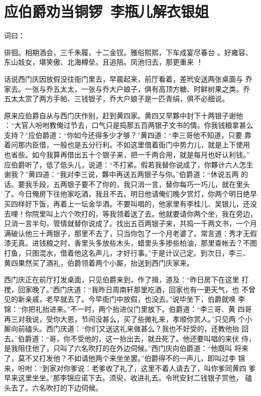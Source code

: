 \chapter{应伯爵劝当铜锣~李瓶儿解衣银姐}

词曰：

徘徊。相期酒会，三千朱履，十二金钗。雅俗熙熙，下车成宴尽春台
。好雍容、东山妓女，堪笑傲、北海樽垒。且追陪。凤池归去，那更重来
！

话说西门庆因放假没往衙门里去，早晨起来，前厅看着，差玳安送两张桌面与
乔家去。一张与乔五太太，一张与乔大户娘子，俱有高顶方糖、时鲜树果之类。乔
五太太赏了两方手帕、三钱银子，乔大户娘子是一匹青绢，俱不必细说。

原来应伯爵自从与西门庆作别，赶到黄四家。黄四又早夥中封下十两银子谢他
：“大官人吩咐教俺过节去，口气只是捣那五百两银子文书的情。你我钱粮拿甚么
支持？”应伯爵道：“你如今还得多少才够？”黄四道：“李三哥他不知道，只要
靠着问那内臣借，一般也是五分行利。不如这里借着衙门中势力儿，就是上下使用
也省些。如今我算再借出五十个银子来，把一千两合用，就是每月也好认利钱。”
应伯爵听了，低了低头儿，说道：“不打紧。假若我替你说成了，你夥计六人怎生
谢我？”黄四道：“我对李三说，夥中再送五两银子与你。”伯爵道：“休说五两
的话。要我手段，五两银子要不了你的，我只消一言，替你每巧一巧儿，就在里头
了。今日俺房下往他家吃酒，我且不去。明日他请俺们晚夕赏灯，你两个明日绝早
买四样好下饭，再着上一坛金华酒。不要叫唱的，他家里有李桂儿、吴银儿，还没
去哩！你院里叫上六个吹打的，等我领着送了去。他就要请你两个坐，我在旁边，
只消一言半句，管情就替你说成了。找出五百两银子来，共捣一千两文书，一个月
满破认他三十两银子，那里不去了，只当你包了一个月老婆了。常言道：秀才无假
漆无真。进钱粮之时，香里头多放些木头，蜡里头多掺些柏油，那里查帐去？不图
打鱼，只图混水，借着他这名声儿，才好行事。”于是计议己定。到次日，李三、
黄四果然买了酒礼，伯爵领着两个小厮，抬送到西门庆家来。

西门庆正在前厅打发桌面，只见伯爵来到，作了揖，道及：“昨日房下在这里
打搅，回家晚了。”西门庆道：“我昨日周南轩那里吃酒，回家也有一更天气，也
不曾见的新亲戚，老早就去了。今早衙门中放假，也没去。”说毕坐下，伯爵就唤
李锦：“你把礼抬进来。”不一时，两个抬进仪门里放下。伯爵道：“李三哥、黄
四哥再三对我说，受你大恩，节间没甚么，买了些微礼来，孝顺你赏人。”只见两
个小厮向前磕头。西门庆道：“你们又送这礼来做甚么？我也不好受的，还教他抬
回去。”伯爵道：“哥，你不受他的，这一抬出去，就丑死了。他还要叫唱的来伏
侍，是我阻住他了，只叫了六名吹打的在外边伺候。”西门庆向伯爵道：“他既叫
将来了，莫不又打发他？不如请他两个来坐坐罢。”伯爵得不的一声儿，即叫过李
锦来，吩咐：“到家对你爹说：老爹收了礼了，这里不着人请去了，叫你爹同黄四
爹早来这里坐坐。”那李锦应诺下去。须臾，收进礼去。令玳安封二钱银子赏他，
磕头去了。六名吹打的下边伺候。

